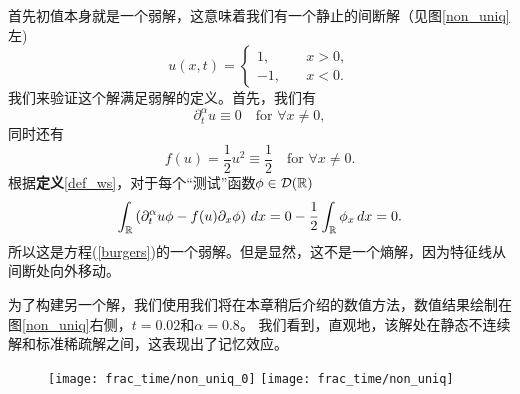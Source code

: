 首先初值本身就是一个弱解，这意味着我们有一个静止的间断解（见图\ref{non_uniq}左)
\begin{equation}
u(x,t) = \begin{cases}
1, \quad & x > 0, \\
-1, \quad & x < 0.
\end{cases}
\end{equation}
我们来验证这个解满足弱解的定义。首先，我们有
\[
\partial_t^\alpha u \equiv 0 \quad\mbox{for } \forall x\ne 0,
\]
同时还有
\[
f(u) = \frac{1}{2}u^2 \equiv \frac{1}{2} \quad\mbox{for } \forall x \ne 0.
\]
根据{\bf 定义}\ref{def_ws}，对于每个``测试''函数$\phi\in\mathcal{D}({\mathbb{R}})$
\[
\int_{\mathbb{R}} \left(\partial_t^\alpha u \phi - f(u)\partial_x\phi\right)\,dx = 0 - \frac{1}{2}\int_{\mathbb{R}} \phi_x\,dx = 0.
\]
所以这是方程(\ref{burgers})的一个弱解。但是显然，这不是一个熵解，因为特征线从间断处向外移动。

为了构建另一个解，我们使用我们将在本章稍后介绍的数值方法，数值结果绘制在图\ref{non_uniq}右侧，$t = 0.02$和$\alpha = 0.8$。
我们看到，直观地，该解处在静态不连续解和标准稀疏解之间，这表现出了记忆效应。
\begin{figure}[htbp]
	\texttt{[image: frac\_time/non\_uniq\_0]}
	\texttt{[image: frac\_time/non\_uniq]}	
\end{figure}

